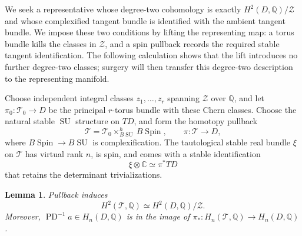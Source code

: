 \documentclass[11pt]{article}
\numberwithin{equation}{section}
\newtheorem{lemma}[theorem]{Lemma}
\theoremstyle{definition}
\theoremstyle{remark}
\newcommand{\Q}{\mathbb Q}
\newcommand{\C}{\mathbb C}
\DeclareMathOperator{\PD}{PD}
\DeclareMathOperator{\Spin}{Spin}
\DeclareMathOperator{\SU}{SU}
\begin{document}
We seek a representative whose degree-two cohomology is exactly
$H^2(D,\Q)/\mathcal Z$ and whose complexified tangent bundle is
identified with the ambient tangent bundle.  We impose these two
conditions by lifting the representing map: a torus bundle kills
the classes in $\mathcal Z$, and a spin pullback records the required
stable tangent identification.  The following calculation shows that
the lift introduces no further degree-two classes; surgery will then
transfer this degree-two description to the representing manifold.

Choose independent integral classes $z_1,\ldots,z_r$ spanning
$\mathcal Z$ over $\Q$, and let
$\pi_0:\mathscr T_0\to D$ be the principal $r$-torus bundle with these
Chern classes.  Choose the natural stable $\SU$ structure on $TD$, and
form the homotopy pullback
\[
 \mathscr T=\mathscr T_0\times^{h}_{B\SU}B\Spin,
 \qquad \pi:\mathscr T\longrightarrow D,
\]
where $B\Spin\to B\SU$ is complexification.  The tautological stable
real bundle $\xi$ on $\mathscr T$ has virtual rank $n$, is spin, and
comes with a stable identification
\begin{equation}\label{topo:tautological}
 \xi\otimes\C\simeq\pi^*TD
\end{equation}
that retains the determinant trivializations.

\begin{lemma}\label{topo:lift}
Pullback induces
\[
 H^2(\mathscr T,\Q)\simeq H^2(D,\Q)/\mathcal Z.
\]
Moreover, $\PD^{-1}a\in H_n(D,\Q)$ is in the image of
$\pi_*:H_n(\mathscr T,\Q)\to H_n(D,\Q)$.
\end{lemma}
\end{document}
